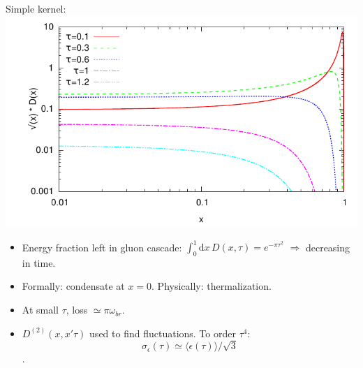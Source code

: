 \documentclass[pstricks,mathserif]{beamer}
\begin{document}
\begin{frame}
Simple kernel:
\includegraphics[width=0.9\linewidth]{plotD.pdf}

\begin{itemize}
\item Energy fraction left in gluon cascade: $\int_0^1 \mathrm{d}x\, D(x,\tau) = e^{-\pi\tau^2}$ $\Rightarrow$ decreasing in time. 
\item Formally: condensate at $x=0$. Physically: thermalization.
\item At small $\tau$, loss $\simeq \pi \omega_{br}$. 
\item $D^{(2)}(x,x'\tau)$ used to find fluctuations. To order $\tau^4$:
 $$\sigma_\epsilon(\tau)\simeq \langle \epsilon(\tau)\rangle/\sqrt{3}$$.
\end{itemize}
 




\end{frame}
\end{document}

